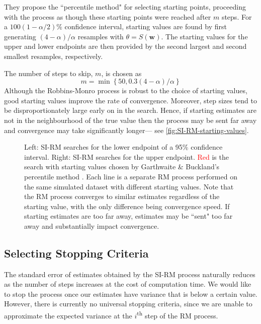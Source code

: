 They propose the ``percentile method" for selecting starting points, proceeding with the process as though these starting points were reached after $m$ steps. For a $100(1-\alpha/2)\%$ confidence interval, starting values are found by first generating $(4-\alpha)/\alpha$ resamples with $\theta = S(\bm{w})$. The starting values for the upper and lower endpoints are then provided by the second largest and second smallest resamples, respectively.

The number of steps to skip, $m$, is chosen as
\[
    m = \min \left\{ 50, 0.3(4-\alpha)/\alpha \right\}
\]
Although the Robbins-Monro process is robust to the choice of starting values, good starting values improve the rate of convergence. Moreover, step sizes tend to be disproportionately large early on in the search. Hence, if starting estimates are not in the neighbourhood of the true value then the process may be sent far away and convergence may take significantly longer--- see \autoref{fig:SI-RM-starting-values}.
\begin{figure}[ht]
    \centering
    
    \caption{Left: SI-RM searches for the lower endpoint of a 95\% confidence interval. Right: SI-RM searches for the upper endpoint. \textcolor{red}{Red} is the search with starting values chosen by Garthwaite \& Buckland's percentile method \cite{Garthwaite1992}. Each line is a separate RM process performed on the same simulated dataset with different starting values. Note that the RM process converges to similar estimates regardless of the starting value, with the only difference being convergence speed. If starting estimates are too far away, estimates may be ``sent" too far away and substantially impact convergence.}
    \label{fig:SI-RM-starting-values}
\end{figure}

\subsection{Selecting Stopping Criteria}\label{subsec:si-rm-stopping-criteria}

The standard error of estimates obtained by the SI-RM process naturally reduces as the number of steps increases at the cost of computation time. We would like to stop the process once our estimates have variance that is below a certain value. However, there is currently no universal stopping criteria, since we are unable to approximate the expected variance at the $i$\textsuperscript{th} step of the RM process. 

